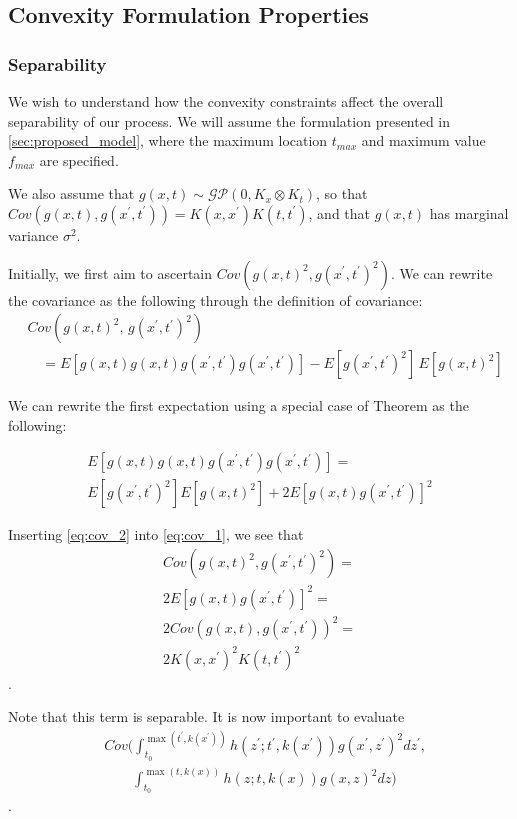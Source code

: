 \subsection{Convexity Formulation Properties}
\label{appendix:convexity_properties}
\subsubsection{Separability}
We wish to understand how the convexity constraints affect the overall separability of our process. We will assume the formulation presented in \ref{sec:proposed_model}, where the maximum location $t_{max}$ and maximum value $f_{max}$ are specified. 
{\sloppy We also assume that $g(x,t) \sim \mathcal{GP}(0, K_x \otimes K_t)$, so that $Cov(g(x,t), g(x^{'},t^{'})) = K(x,x^{'})K(t,t^{'})$, and that $g(x,t)$ has marginal variance $\sigma^2$.\par}

Initially, we first aim to ascertain $Cov(g(x,t)^2,g(x^{'},t^{'})^2)$.
We can rewrite the covariance as the following through the definition of covariance:
\begin{align}
    \label{eq:cov_1}
    &Cov\!\left(g(x,t)^2,\,g(x^{'},t^{'})^2\right) \nonumber\\
    &\quad = E[g(x,t)g(x,t)g(x^{'},t^{'})g(x^{'},t^{'})] - E[g(x^{'},t^{'})^2]\,E[g(x,t)^2]
\end{align}


We can rewrite the first expectation using a special case of \cite{isserlis} Theorem as the following:

\begin{align}
\label{eq:cov_2}
E[g(x,t)g(x,t)g(x^{'},t^{'})g(x^{'},t^{'})] = \nonumber \\ E[g(x^{'},t^{'})^2]E[g(x,t)^2] + 2E[g(x,t)g(x^{'},t^{'})]^2 
\end{align}

Inserting \eqref{eq:cov_2} into \eqref{eq:cov_1}, we see that 
\begin{align}
\label{eq:cov_3}
    Cov(g(x,t)^2,g(x^{'},t^{'})^2) = \nonumber \\ 2E[g(x,t)g(x^{'},t^{'})]^2 = \nonumber\\ 2Cov(g(x,t), g(x^{'},t^{'}))^2 = \nonumber\\ 2K(x,x^{'})^2K(t,t^{'})^2 
\end{align}. 

Note that this term is separable. 
It is now important to evaluate
\begin{align}
\label{eq:cov_integral}
&Cov \bigg(\int_{t_0}^{\max(t^{'},k(x^{'}))} h(z^{'}; t^{'}, k(x^{'})) g(x^{'},z^{'})^2 dz^{'}, \nonumber\\
&\qquad \int_{t_0}^{\max(t,k(x))} h(z; t, k(x)) g(x,z)^2 dz \bigg)
\end{align}.

